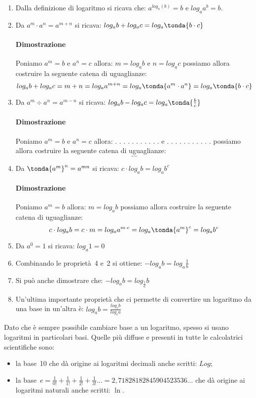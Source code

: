 \begin{enumerate} 
 \item Dalla definizione di logaritmo si ricava che:
\(a^{log_a(b)} = b\) e \(log_a{a^b} = b\).
 \item Da \quad \(a^m \cdot a^n = a^{m+n}\) \quad si ricava: \quad
 \(log_a {b} + log_a {c} = log_a \tonda{b \cdot c} \)
\paragraph{Dimostrazione} 
Poniamo \(a^m = b\) e \(a^n = c\) 
allora: \(m = log_a {b}\) e \(n = log_a {c}\) possiamo allora costruire la 
seguente catena di uguaglianze:
\[log_a {b} + log_a {c} =
m + n =  
log_a {a^{m + n}} =
log_a \tonda{{a^m \cdot a^n}}  =
log_a \tonda{{b \cdot c}}\]
 \item Da \quad \(a^m \div a^n = a^{m-n}\) \quad si ricava: \quad
 \(log_a {b} - log_a {c} = log_a \tonda{\frac{b}{c}}\)
\paragraph{Dimostrazione} 
Poniamo \(a^m = b\) e \(a^n = c\) 
allora: . . . . . . . . . . . e . . . . . . . . . . . 
possiamo allora costruire la seguente catena di uguaglianze:
\[\dots\]
 \item Da \quad \(\tonda{a^m}^n = a^{mn}\) \quad si ricava: \quad
 \(c \cdot log_a {b} = log_a {b^c} \)
\paragraph{Dimostrazione} 
Poniamo \(a^m = b\)  
allora: \(m = log_a {b}\) possiamo allora costruire la 
seguente catena di uguaglianze:
\[c \cdot log_a {b} =
c \cdot m = 
log_a {a^{m \cdot c}} =
log_a {\tonda{a^{m}}^c} = 
log_a {b^c}\]
 \item Da \quad \(a^0 = 1\) \quad si ricava: \quad
 \(log_a {1} = 0\)
 \item Combinando le proprietà~4 e~2 si ottiene: \quad
 \(-log_a {b} = log_a {\frac{1}{b}}\)
 \item Si può anche dimostrare che: \quad
 \(-log_a {b} = log_{\frac{1}{a}} b\)
 \item Un'ultima importante proprietà che ci permette di convertire un 
logaritmo da una base in un'altra è: \quad
 \(log_a {b} = \frac{log_c b}{log_c a}\)
\end{enumerate}

\noindent
Dato che è sempre possibile cambiare base a un logaritmo, spesso si 
usano logaritmi in particolari basi. Quelle più diffuse e presenti in tutte le 
calcolatrici scientifiche sono: 
\begin{itemize}
 \item 
la base~10 che dà origine ai logaritmi decimali anche scritti: \(Log\);
 \item 
la base~\(e = \frac{1}{0!} + \frac{1}{1!} + \frac{1}{2!} + \frac{1}{3!} \dots = 
2,71828 18284 59045 23536\dots \) che dà origine ai logaritmi naturali anche 
scritti: \(\ln\).
\end{itemize}

